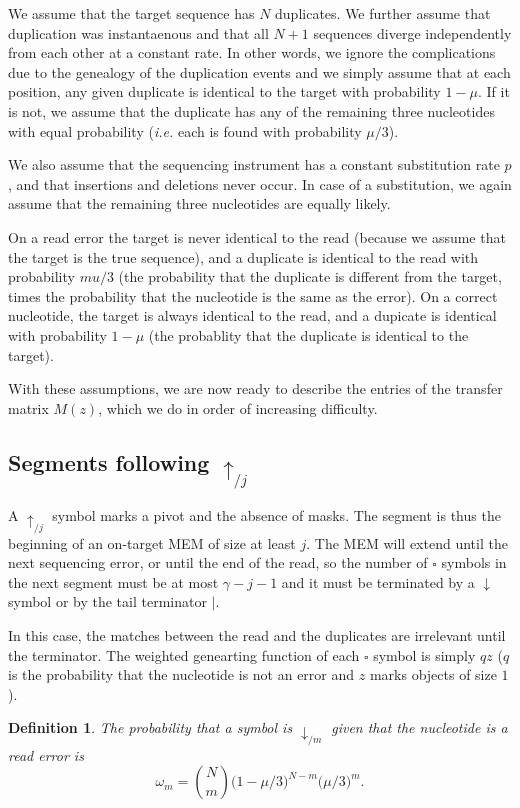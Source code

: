 \documentclass{article}
\newtheorem{definition}{Definition}
\begin{document}
We assume that the target sequence has $N$ duplicates. We further assume
that duplication was instantaenous and that all $N+1$ sequences diverge
independently from each other at a constant rate. In other words, we
ignore the complications due to the genealogy of the duplication events
and we simply assume that at each position, any given duplicate is
identical to the target with probability $1-\mu$. If it is not, we
assume that the duplicate has any of the remaining three nucleotides with
equal probability (\textit{i.e.} each is found with probability $\mu/3$).

We also assume that the sequencing instrument has a constant substitution
rate $p$, and that insertions and deletions never occur. In case of a
substitution, we again assume that the remaining three nucleotides are
equally likely.

On a read error the target is never identical to the read (because we
assume that the target is the true sequence), and a duplicate is identical
to the read with probability $mu/3$ (the probability that the duplicate is
different from the target, times the probability that the nucleotide is
the same as the error). On a correct nucleotide, the target is always
identical to the read, and a dupicate is identical with probability
$1-\mu$ (the probablity that the duplicate is identical to the target).

With these assumptions, we are now ready to describe the entries of the
transfer matrix $M(z)$, which we do in order of increasing difficulty.


\subsection{Segments following $\uparrow_{/j}$}

A $\uparrow_{/j}$ symbol marks a pivot and the absence of masks. The
segment is thus the beginning of an on-target MEM of size at least $j$.
The MEM will extend until the next sequencing error, or until the end of
the read, so the number of $\square$ symbols in the next segment must be
at most $\gamma-j-1$ and it must be terminated by a $\downarrow$ symbol or
by the tail terminator $|$.

In this case, the matches between the read and the duplicates are
irrelevant until the terminator. The weighted genearting function of each
$\square$ symbol is simply $qz$ ($q$ is the probability that the
nucleotide is not an error and $z$ marks objects of size $1$).

\begin{definition}
The probability that a symbol is $\downarrow_{/m}$ given that the
nucleotide is a read error is
\begin{equation}
\label{eq:omega}
\omega_m = {N \choose m} \big(1 - \mu/3\big)^{N-m} \big(\mu/3\big)^m.
\end{equation}
\end{definition}
\end{document}
